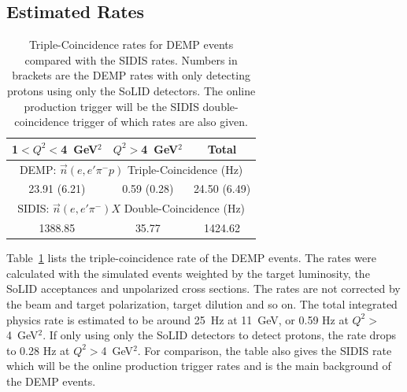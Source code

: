 \subsection{Estimated Rates}
\begin{table}[!ht]
\centering
\begin{tabular}{|c|c|c|}
 \hline
  1$<Q^{2}<$4~GeV$^{2}$ & $Q^{2}>$4~GeV$^{2}$ & Total\\
 \hline
\multicolumn{3}{|c|}{DEMP: $\vec{n}(e,e'\pi^{-}p)$ Triple-Coincidence (Hz)}\\
 \hline
 23.91 (6.21)   &  0.59 (0.28) & 24.50 (6.49)   \\
 \hline
\multicolumn{3}{|c|}{SIDIS: $\vec{n}(e,e'\pi^{-})X$ Double-Coincidence (Hz)}\\
 \hline
        1388.85 & 35.77        & 1424.62   \\
 \hline
\end{tabular}
\caption[Triple-Coincidence rates for
  neutron-DEMP]{\footnotesize{Triple-Coincidence rates for DEMP events compared
    with the SIDIS rates. Numbers in brackets are the DEMP rates with only
    detecting protons using only the SoLID detectors. The online production
    trigger will be the SIDIS double-coincidence trigger of which rates are
    also given.}}
\label{rate_table}
\end{table} 
Table~\ref{rate_table} lists the triple-coincidence rate of the DEMP
events. The rates were calculated with the simulated events weighted by the
target luminosity, the SoLID acceptances and unpolarized cross sections. The
rates are not corrected by the beam and target polarization, target dilution
and so on. The total integrated physics rate is estimated to be around 25~Hz at
11~GeV, or 0.59 Hz at $Q^{2}>$4~GeV$^{2}$. If only using only the 
SoLID detectors to detect protons, the rate drops to 0.28 Hz at
$Q^{2}>$4~GeV$^{2}$.  For comparison, the table also gives the SIDIS rate
which will be the online production trigger rates and is the main background of
the DEMP events.

